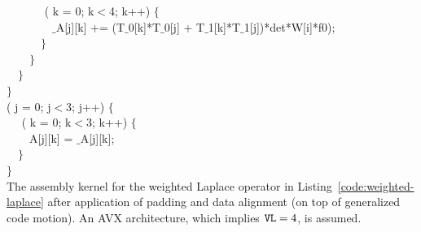 \begin{algorithm}
~~~~~~ ( k = 0; k$<$4; k++) $\lbrace$\\
~~~~~~~~$\_$A[j][k] += (T$\_$0[k]*T$\_$0[j] + T$\_$1[k]*T$\_$1[j])*det*W[i]*f0);\\
~~~~~~$\rbrace$\\
~~~~$\rbrace$\\
~~$\rbrace$\\
$\rbrace$\\
 ( j = 0; j$<$3; j++) $\lbrace$\\
~~ ( k = 0; k$<$3; k++) $\lbrace$\\
~~~~A[j][k] = $\_$A[j][k];\\
~~$\rbrace$\\
$\rbrace$\\

\caption{The assembly kernel for the weighted Laplace operator in Listing~\ref{code:weighted-laplace} after application of padding and data alignment (on top of generalized code motion). An AVX architecture, which implies $\mbox{\texttt{VL}}=4$, is assumed.}
\label{code:weighted-laplace-licm-pad}
\end{algorithm}

%
%
%

